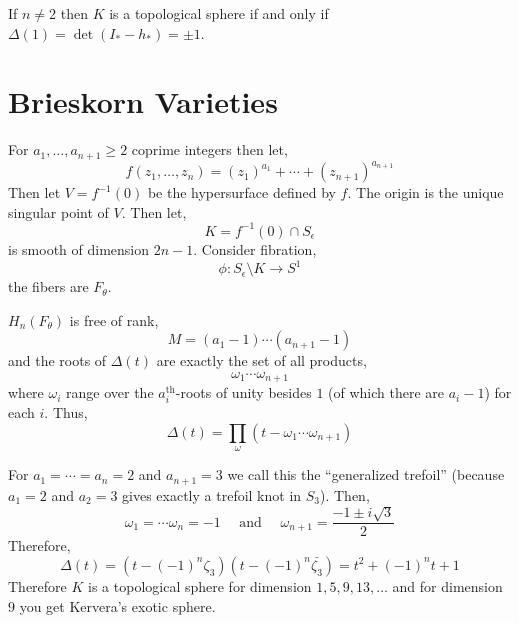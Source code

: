 \documentclass[12pt]{article}
\begin{document}
\begin{thm}
If $n \neq 2$ then $K$ is a topological sphere if and only if $\Delta(1) = \det{(I_* - h_*)} = \pm 1$. 
\end{thm}
 
\section{Brieskorn Varieties}

For $a_1, \dots, a_{n+1} \ge 2$ coprime integers then let,
\[ f(z_1, \dots, z_n) = (z_1)^{a_1} + \cdots + (z_{n+1})^{a_{n+1}} \]
Then let $V = f^{-1}(0)$ be the hypersurface defined by $f$. The origin is the unique singular point of $V$. Then let,
\[ K = f^{-1}(0) \cap S_\epsilon \]
is smooth of dimension $2n - 1$. Consider fibration,
\[ \phi : S_\epsilon \setminus K \to S^1 \]
the fibers are $F_\theta$.  
 
\begin{thm}
$H_n(F_\theta)$ is free of rank,
\[M = (a_1 - 1) \cdots (a_{n+1} - 1)\]
and the roots of $\Delta(t)$ are exactly the set of all products,
\[ \omega_1 \cdots \omega_{n+1} \]
where $\omega_i$ range over the $a_i^{\text{th}}$-roots of unity besides $1$ (of which there are $a_i - 1$) for each $i$. Thus,
\[ \Delta(t) = \prod_{\omega} (t - \omega_1 \cdots \omega_{n+1}) \]
\end{thm} 

\begin{example}
For $a_1 = \cdots = a_n = 2$ and $a_{n+1} = 3$ we call this the ``generalized trefoil'' (because $a_1 = 2$ and $a_2 = 3$ gives exactly a trefoil knot in $S_3$). Then,
\[ \omega_1 = \cdots \omega_n = -1 \quad \text{ and } \quad \omega_{n+1} = \frac{-1 \pm i \sqrt{3}}{2} \]
Therefore,
\[ \Delta(t) = \left( t - (-1)^n \zeta_3 \right) \left( t - (-1)^n \bar{\zeta_3} \right) = t^2 + (-1)^n t + 1 \]
Therefore $K$ is a topological sphere for dimension $1,5,9,13, \dots$ and for dimension $9$ you get Kervera's exotic sphere. 
\end{example}
 
\end{document}
